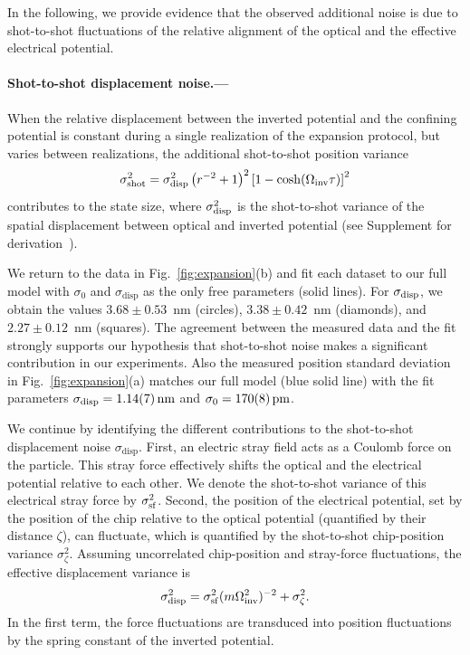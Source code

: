 \documentclass[aps,prl,reprint,twocolumn,superscriptaddress]{revtex4-2}
\begin{document}
In the following, we provide evidence that the observed additional noise is due to shot-to-shot fluctuations of the relative alignment of the optical and the effective electrical potential. 




\paragraph{Shot-to-shot displacement noise.---}
When the relative displacement between the inverted potential and the confining potential is constant during a single realization of the expansion protocol, but varies between realizations, the additional shot-to-shot position variance
\begin{equation}
\sigma^2_{\rm shot} =\sigma^2_{\rm disp} \left(r^{-2}+1\right)^2\left[1-\cosh(\Omega_{\rm inv}\tau)\right]^2
\label{eq:shottoshot}
\end{equation}
contributes to the state size, where $\sigma^2_{\rm disp}$ is the shot-to-shot variance of the spatial displacement between optical and inverted potential (see Supplement for derivation~\cite{supplement}).


We return to the data in Fig.~\ref{fig:expansion}(b) and fit each dataset to our full model with $\sigma_0$ and $\sigma_{\mathrm{disp}}$ as the only free parameters (solid lines). For $\sigma_{\rm disp}$, we obtain the values $3.68\pm0.53$~nm (circles), $3.38\pm0.42$~nm (diamonds), and $2.27\pm0.12$~nm (squares). 
The agreement between the measured data and the fit strongly supports our hypothesis that shot-to-shot noise makes a significant contribution in our experiments.
Also the measured position standard deviation in Fig.~\ref{fig:expansion}(a) matches our full model (blue solid line) with the fit parameters $\sigma_{\rm disp}  = \SI{1.14 \pm 0.07}{\nano\meter}$ and $\sigma_0=\SI{170 \pm 8}{\pico\meter}$.





We continue by identifying the different contributions to the shot-to-shot displacement noise $\sigma_\text{disp}$. 
First, an electric stray field acts as a Coulomb force on the particle. 
This stray force effectively shifts the optical and the electrical potential relative to each other. 
We denote the shot-to-shot variance of this electrical stray force by $\sigma^2_{\rm sf}$.  Second, the position of the electrical potential, set by the position of the chip relative to the optical potential (quantified by their distance $\zeta$), can fluctuate, which is quantified by the shot-to-shot chip-position variance $\sigma_{\zeta}^2$. 
Assuming uncorrelated chip-position and stray-force fluctuations, the effective displacement variance is
\begin{equation}
\sigma^2_{\rm disp}=\sigma^2_{\rm sf}(m\Omega^2_{\rm inv})^{-2}+ \sigma^2_{\zeta}.
\label{eq:sigmadisp}
\end{equation}
In the first term, the force fluctuations are transduced into position fluctuations by the spring constant of the inverted potential.
\end{document}
